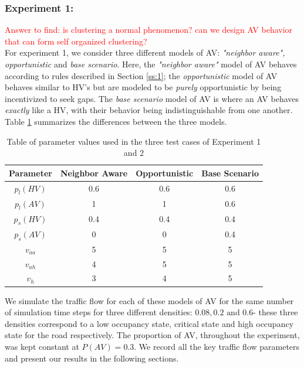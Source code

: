 \documentclass[oneside,letter,11pt]{article}
\begin{document}
\subsubsection{\textbf{Experiment 1:}}
\textcolor{red}{Answer to find: is clustering a normal phenomenon? can we design AV behavior that can form self organized clustering?\\}
For experiment 1, we consider three different models of AV: \textit{"neighbor aware", opportunistic} and \textit{base scenario}. Here, the \textit{"neighbor aware"} model of AV behaves according to rules described in Section \ref{ss:1}; the \textit{opportunistic} model of AV behaves similar to HV's but are modeled to be \textit{purely} opportunistic by being incentivized to seek gaps. The \textit{base scenario} model of AV is where an AV behaves \textit{exactly} like a HV, with their behavior being indistinguishable from one another. Table \ref{tbl:x} summarizes the differences between the three models.

\begin{table}[H]
\centering
\begin{tabular}{ |c|c|c|c| } 
 \hline
 Parameter & Neighbor Aware & Opportunistic & Base Scenario  \\ 
  \hline
 $p_{l}(HV)$ & 0.6 & 0.6 & 0.6 \\ 
 $p_{l}(AV)$ & 1 & 1 & 0.6  \\ 
  \hline
 $p_{s}(HV)$ & 0.4 & 0.4 & 0.4  \\ 
 $p_{s}(AV)$ & 0  & 0 & 0.4\\ 
 \hline
 $v_{aa}$ & 5 & 5 & 5  \\ 
 $v_{ah}$ & 4  & 5 & 5\\ 
 $v_h$ & 3  & 4 & 5\\ 
 \hline
\end{tabular}
\caption{Table of parameter values used in the three test cases of Experiment 1 and 2}
\label{tbl:x}
\end{table}

We simulate the traffic flow for each of these models of AV for the same number of simulation time steps for three different densities: $0.08, 0.2 \text{ and } 0.6$- these three densities correspond to a low occupancy state, critical state and high occupancy state for the road respectively. The proportion of AV, throughout the experiment, was kept constant at $P(AV)=0.3$. We record all the key traffic flow parameters and present our results in the following sections.
\end{document}
